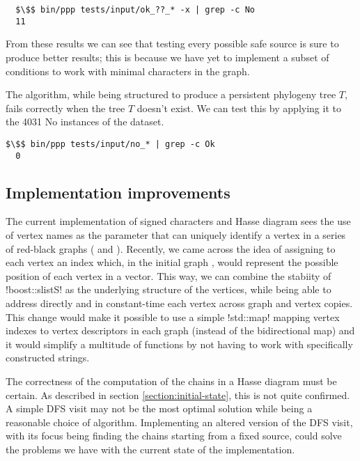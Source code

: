 \begin{lstlisting}
  $\$$ bin/ppp tests/input/ok_??_* -x | grep -c No
  11
\end{lstlisting}

From these results we can see that testing every possible safe source is sure to produce better results; this is because we have yet to implement a subset of conditions to work with minimal characters in the graph.

The algorithm, while being structured to produce a persistent phylogeny tree $T$, fails correctly when the tree $T$ doesn't exist. We can test this by applying it to the 4031 No instances of the dataset.

\begin{lstlisting}[belowskip=0pt]
  $\$$ bin/ppp tests/input/no_* | grep -c Ok
  0
\end{lstlisting}

\subsection{Implementation improvements}\label{section:impl-improvements}

The current implementation of signed characters and Hasse diagram sees the use of vertex names as the parameter that can uniquely identify a vertex in a series of red-black graphs (\grb{} and \gm{}).
Recently, we came across the idea of assigning to each vertex an index which, in the initial graph \grb{}, would represent the possible position of each vertex in a vector. This way, we can combine the stabiity of !boost::slistS! as the underlying structure of the vertices, while being able to address directly and in constant-time each vertex across graph and vertex copies.
This change would make it possible to use a simple !std::map! mapping vertex indexes to vertex descriptors in each graph (instead of the bidirectional map) and it would simplify a multitude of functions by not having to work with specifically constructed strings.

The correctness of the computation of the chains in a Hasse diagram must be certain. As described in section \ref{section:initial-state}, this is not quite confirmed.
A simple DFS visit may not be the most optimal solution \textendash{} while being a reasonable choice of algorithm.
Implementing an altered version of the DFS visit, with its focus being finding the chains starting from a fixed source, could solve the problems we have with the current state of the implementation.

